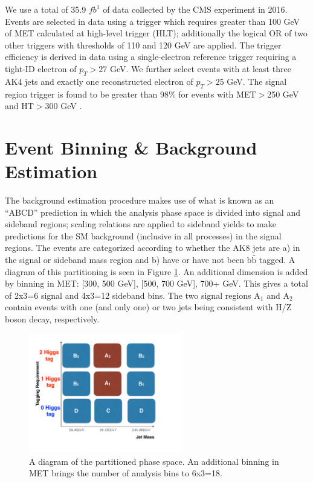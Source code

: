We use a total of 35.9 $fb^{1}$ of data collected by the CMS experiment in 2016. Events are selected in data using a trigger which requires greater than 100 GeV of MET calculated at high-level trigger (HLT); additionally the logical OR of two other triggers with thresholds of 110 and 120 GeV are applied. The trigger efficiency is derived in data using a single-electron reference trigger requiring a tight-ID electron of $p_{T}>27$ GeV. We further select events with at least three AK4 jets and exactly one reconstructed electron of $p_{T}>25$ GeV. The signal region trigger is found to be greater than 98\% for events with MET$>$250 GeV and HT$>$300 GeV \cite{CMS-SUS-16-033}.



\section{Event Binning \& Background Estimation}

The background estimation procedure makes use of what is known as an ``ABCD'' prediction in which the analysis phase space is divided into signal and sideband regions; scaling relations are applied to sideband yields to make predictions for the SM background (inclusive in all processes) in the signal regions. The events are categorized according to whether the AK8 jets are a) in the signal or sideband mass region and b) have or have not been $\mathrm{b}\bar{\mathrm{b}}$ tagged.  A diagram of this partitioning is seen in Figure \ref{fig:abcd}. An additional dimension is added by binning in MET: [300, 500 GeV], [500, 700 GeV], 700+ GeV. This gives a total of 2x3=6 signal and 4x3=12 sideband bins. The two signal regions $\mathrm{A}_{1}$ and $\mathrm{A}_{2}$ contain events with one (and only one) or two jets being consistent with H/Z boson decay, respectively.

\begin{figure}[htbp]
\centering
\includegraphics[width=0.6\textwidth]{figs/SUS17006/CMS-SUS-17-006_Figure-aux_002.pdf}
\caption{A diagram of the partitioned phase space. An additional binning in MET brings the number of analysis bins to 6x3=18.}
\label{fig:abcd}
\end{figure}

